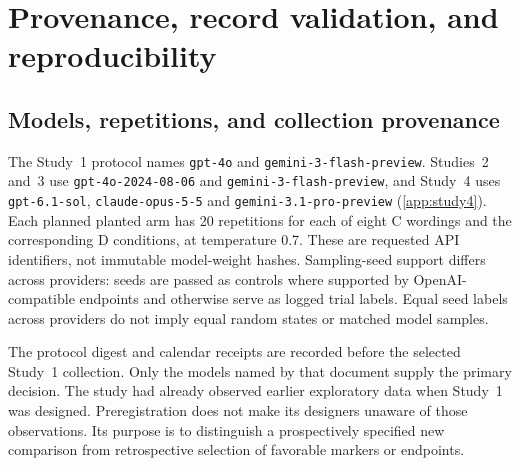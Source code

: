 \documentclass[final,5p,times,twocolumn]{elsarticle}
\begin{document}
\section{Provenance, record validation, and reproducibility}
\label{app:reproduction}
\subsection{Models, repetitions, and collection provenance}
The Study~1 protocol names \texttt{gpt-4o} and
\texttt{gemini-3-flash-preview}. Studies~2 and~3 use
\texttt{gpt-4o-2024-08-06} and \texttt{gemini-3-flash-preview}, and Study~4
uses \texttt{gpt-6.1-sol}, \texttt{claude-opus-5-5} and
\texttt{gemini-3.1-pro-preview} (\ref{app:study4}). Each planned planted arm has 20 repetitions
for each of eight C wordings and the corresponding D conditions, at temperature
0.7. These are requested API identifiers, not immutable model-weight hashes.
Sampling-seed support differs across providers: seeds are passed as controls
where supported by OpenAI-compatible endpoints and otherwise serve as logged
trial labels. Equal seed labels across providers do not imply equal random
states or matched model samples.

The protocol digest and calendar receipts are recorded before the selected Study~1
collection. Only the models named by that document supply the primary decision.
The study had already observed earlier exploratory data when Study~1 was designed. Preregistration does not make its designers unaware of those observations.
Its purpose is to distinguish a prospectively specified new comparison from
retrospective selection of favorable markers or endpoints.
\end{document}

